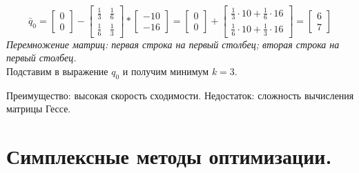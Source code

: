 \documentclass[12pt,a5paper]{scrbook}
\begin{document}
  $$\bar{q}_0 = \begin{bmatrix}
    0 \\
    0
  \end{bmatrix} - \begin{bmatrix}
    \frac{1}{3} & \frac{1}{6} \\[0.3em]
    \frac{1}{6} & \frac{1}{3}
  \end{bmatrix} \ast \begin{bmatrix}
    -10 \\
    -16
  \end{bmatrix} = \begin{bmatrix}
    0 \\
    0
  \end{bmatrix} + \begin{bmatrix}
    \frac{1}{3}\cdot 10 + \frac{1}{6}\cdot 16 \\
    \frac{1}{6}\cdot 10 + \frac{1}{3}\cdot 16
  \end{bmatrix} = \begin{bmatrix}
    6 \\
    7
  \end{bmatrix}$$
  \textit{Перемножение матриц: первая строка на первый столбец; вторая строка на первый столбец.}\\
  Подставим в выражение $q_0$ и получим минимум $k=3$.\par
  Преимущество: высокая скорость сходимости.
  Недостаток: сложность вычисления матрицы Гессе. 
  
  \chapter{Симплексные методы оптимизации.}
  
\end{document}
